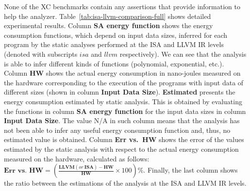 \documentclass{llncs}
\newcommand{\levels}{levels\xspace}
\newcommand{\llvmir}{LLVM IR\xspace}
\begin{document}
None of the XC benchmarks contain any assertions that provide
information to help the analyzer.
Table~\ref{tab:isa-llvm-comparison-full} shows detailed experimental results.
Column \textbf{SA energy function} shows the energy consumption
functions, which depend on input data sizes, inferred for each program
by the static analyses performed at the ISA and \llvmir \levels
(denoted with subscripts $isa$ and $llvm$ respectively). We can see
that the analysis is able to infer different kinds of functions
(polynomial, exponential, etc.). Column \textbf{HW} shows the actual
energy consumption in nano-joules measured on the hardware
corresponding to the execution of the programs with input data of
different sizes (shown in column \textbf{Input Data Size}). 
\textbf{Estimated} presents the energy consumption estimated by static
analysis. This is obtained by evaluating the functions in column \textbf{SA
  energy function} for the input data sizes in column \textbf{Input
  Data Size}. The value N/A in such column means that the analysis has
not been able to infer any useful 
energy consumption function and, thus, no
estimated value is obtained. Column \textbf{Err vs.\ HW} shows
the error of the values estimated by the static analysis with respect
to the actual energy consumption measured on the hardware, calculated as follows:
$\textbf{Err vs.\ HW}= (\frac{\textbf{LLVM} (or \ \textbf{ISA}) - \textbf{HW}}{\textbf{HW}} \times 100 ) \%$.
Finally, the last column shows the ratio between the estimations of
 the analysis at the ISA and \llvmir \levels. 
\end{document}
